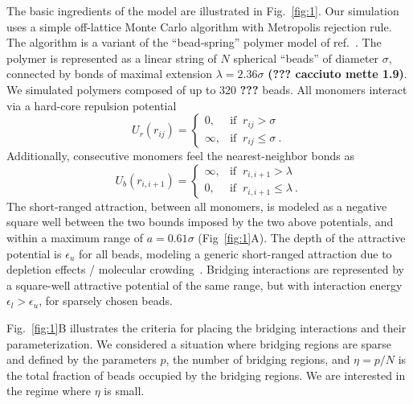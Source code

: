 \documentclass[a4paper,12pt,pre,superscriptaddress]{revtex4}
\begin{document}
The basic ingredients of the model are illustrated in
Fig.~\ref{fig:1}. Our simulation uses a simple off-lattice Monte Carlo
algorithm with Metropolis rejection rule. The algorithm is a variant
of the ``bead-spring'' polymer model of ref.~\cite{Cacciuto2006}. The
polymer is represented as a linear string of $N$ spherical ``beads''
of diameter $\sigma$, connected by bonds of maximal extension $\lambda
= 2.36 \sigma$ \textbf{(??? cacciuto mette 1.9)}. We simulated
polymers composed of up to 320 \textbf{???} beads.  All monomers
interact via a hard-core repulsion potential
\begin{displaymath}
  U_r(r_{ij}) = \begin{cases} 
    0,  & \mbox{if }\ r_{ij} > \sigma \\ 
    \infty, & \mbox{if }\ r_{ij} \leq \sigma \ . 
  \end{cases} 
\end{displaymath}
Additionally, consecutive monomers feel the nearest-neighbor bonds as 
\begin{displaymath}
  U_b(r_{i,i+1}) = \begin{cases} 
    \infty,  & \mbox{if }\ r_{i,i+1} > \lambda \\ 
    0, & \mbox{if }\ r_{i,i+1} \leq \lambda \ . 
  \end{cases} 
\end{displaymath}
The short-ranged attraction, between all monomers, is modeled as a
negative square well between the two bounds imposed by the two above
potentials, and within a maximum range of $a = 0.61\sigma$
(Fig~\ref{fig:1}A). The depth of the attractive potential is
$\epsilon_u$ for all beads, modeling a generic short-ranged attraction
due to depletion effects / molecular crowding~\cite{Noro2000}.
Bridging interactions are represented by a square-well attractive
potential of the same range, but with interaction energy $\epsilon_l >
\epsilon_u$, for sparsely chosen beads.
%

Fig.~\ref{fig:1}B illustrates the criteria for placing the bridging
interactions and their parameterization. We considered a situation
where bridging regions are sparse and defined by the parameters $p$,
the number of bridging regions, and $\eta=p/N$ is the total fraction
of beads occupied by the bridging regions. We are interested in the
regime where $\eta$ is small. 
\end{document}
